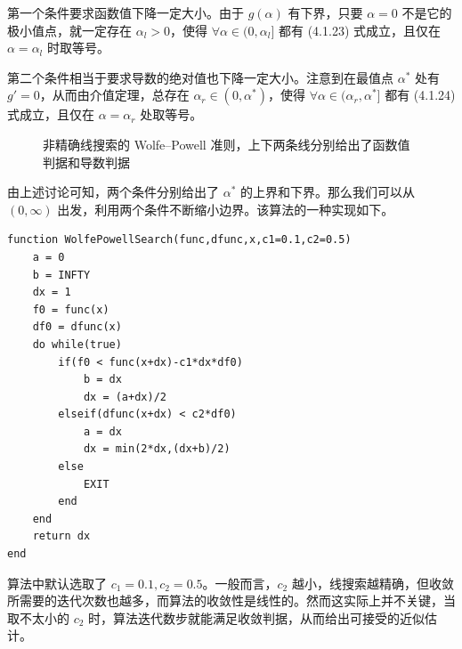 第一个条件要求函数值下降一定大小。由于 $g(\alpha)$ 有下界，只要 $\alpha=0$ 不是它的极小值点，就一定存在 $\alpha_l>0$，使得 $\forall\alpha\in(0,\alpha_l]$ 都有 (4.1.23) 式成立，且仅在 $\alpha=\alpha_l$ 时取等号。

第二个条件相当于要求导数的绝对值也下降一定大小。注意到在最值点 $\alpha^*$ 处有 $g'=0$，从而由介值定理，总存在 $\alpha_r\in(0,\alpha^*)$，使得 $\forall\alpha\in(\alpha_r,\alpha^*]$ 都有 (4.1.24) 式成立，且仅在 $\alpha=\alpha_r$ 处取等号。

\begin{figure}[htbp]
\centering
{}
\caption{非精确线搜索的 Wolfe--Powell 准则，上下两条线分别给出了函数值判据和导数判据}
\label{fig:wolfe-powell}
\end{figure}

由上述讨论可知，两个条件分别给出了 $\alpha^*$ 的上界和下界。那么我们可以从 $(0,\infty)$ 出发，利用两个条件不断缩小边界。该算法的一种实现如下。

\begin{algorithmBox}
\begin{lstlisting}[style=bellacode]
function WolfePowellSearch(func,dfunc,x,c1=0.1,c2=0.5)
    a = 0
    b = INFTY
    dx = 1
    f0 = func(x)
    df0 = dfunc(x)
    do while(true)
        if(f0 < func(x+dx)-c1*dx*df0)
            b = dx
            dx = (a+dx)/2
        elseif(dfunc(x+dx) < c2*df0)
            a = dx
            dx = min(2*dx,(dx+b)/2)
        else
            EXIT
        end
    end
    return dx
end
\end{lstlisting}
\end{algorithmBox}

算法中默认选取了 $c_1=0.1,c_2=0.5$。一般而言，$c_2$ 越小，线搜索越精确，但收敛所需要的迭代次数也越多，而算法的收敛性是线性的。然而这实际上并不关键，当取不太小的 $c_2$ 时，算法迭代数步就能满足收敛判据，从而给出可接受的近似估计。

